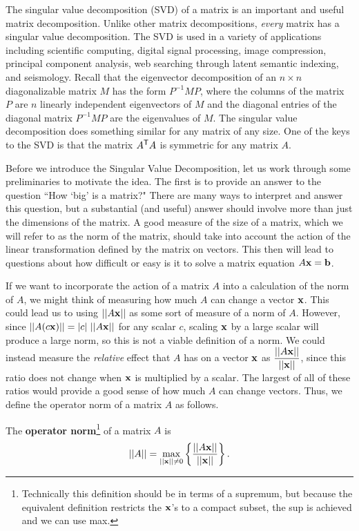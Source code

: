 The singular value decomposition (SVD) of a matrix is an important and useful matrix decomposition. Unlike other matrix decompositions, \emph{every} matrix has a singular value decomposition. The SVD is used in a variety of applications including scientific computing, digital signal processing, image compression, principal component analysis, web searching through latent semantic indexing, and seismology. 
Recall that the eigenvector decomposition of an $n \times n$ diagonalizable matrix $M$ has the form $P^{-1}MP$, where the columns of the matrix $P$ are $n$ linearly independent eigenvectors of $M$ and the diagonal entries of the diagonal matrix $P^{-1}MP$ are the eigenvalues of $M$. The singular value decomposition does something similar for any matrix of any size. One of the keys to the SVD is that the matrix $A^{\mathsf{T}}A$ is symmetric for any matrix $A$. 



Before we introduce the Singular Value Decomposition, let us work through some preliminaries to motivate the idea. The first is to provide an answer to the question ``How `big' is a matrix?" There are many ways to interpret and answer this question, but a substantial (and useful) answer should involve more than just the dimensions of the matrix. A good measure of the size of a matrix, which we will refer to as the norm of the matrix, should take into account the action of the linear transformation defined by the matrix on vectors. This then will lead to questions about how difficult or easy is it to solve a matrix equation $A \mathbf{x} = \mathbf{b}$.

If we want to incorporate the action of a matrix $A$ into a calculation of the norm of $A$, we might think of measuring how much $A$ can change a vector $\mathbf{x}$. This could lead us to using $||A\mathbf{x}||$ as some sort of measure of a norm of $A$. However, since $||A (c\vx)|| = |c| \ ||A\vx||$ for any scalar $c$, scaling $\mathbf{x}$ by a large scalar will produce a large norm, so this is not a viable definition of a norm. We could instead measure the \emph{relative} effect that $A$ has on a vector $\mathbf{x}$ as $\displaystyle \frac{||A\mathbf{x}||}{||\mathbf{x}||}$, since this ratio does not change when $\mathbf{x}$ is multiplied by a scalar. The largest of all of these ratios would provide a good sense of how much $A$ can change vectors. Thus, we define the operator norm of a matrix $A$ as follows.

\begin{definition} The \textbf{operator norm}\footnote{Technically this definition should be in terms of a supremum, but because the equivalent definition restricts the $\mathbf{x}$'s to a compact subset, the sup is achieved and we can use max.} of a matrix $A$ is  
\[||A|| = \max_{||\mathbf{x}|| \neq 0} \left\{\frac{||A\mathbf{x}||}{||\mathbf{x}||} \right\}.\]
\end{definition}

